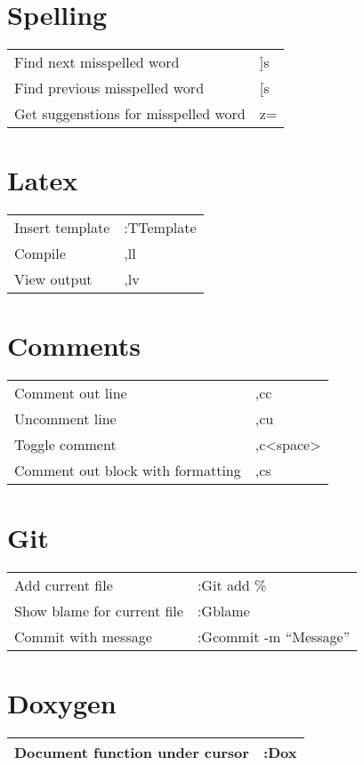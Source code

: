 \documentclass[a4paper]{report}
\def \tablewidth {9cm}
\begin{document}
\tableofcontents
\newpage

\section{Spelling}
\begin{tabularx}{\tablewidth}{| X | l |}
  \hline
  Find next misspelled word & ]s \\
  Find previous misspelled word & [s \\
  Get suggenstions for misspelled word & z= \\
  \hline
\end{tabularx}

\section{Latex}
\begin{tabularx}{\tablewidth}{| X | l |}
  \hline
  Insert template & :TTemplate \\
  Compile & ,ll \\
  View output & ,lv\\
  \hline
\end{tabularx}

\section{Comments}
\begin{tabularx}{\tablewidth}{| X | l |}
  \hline
  Comment out line & ,cc \\
  Uncomment line & ,cu \\
  Toggle comment & ,c\textless space\textgreater \\
  Comment out block with formatting & ,cs \\
  \hline
\end{tabularx}

\section{Git}
\begin{tabularx}{\tablewidth}{| X | l |}
  \hline
  Add current file & :Git add \% \\
  Show blame for current file & :Gblame \\
  Commit with message & :Gcommit -m ``Message'' \\
  \hline
\end{tabularx}

\section{Doxygen}
\begin{tabularx}{\tablewidth}{| X | l |}
  \hline
  Document function under cursor & :Dox \\
  \hline
\end{tabularx}
\end{document}
